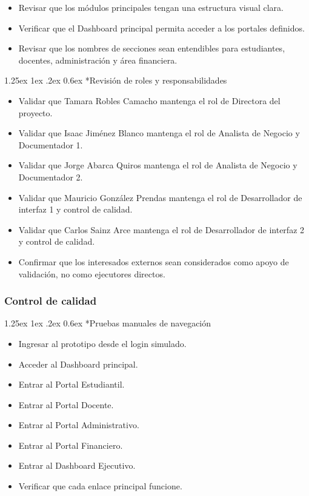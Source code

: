 \documentclass[11pt,spanish]{article}
\makeatletter
\renewcommand\paragraph{\@startsection{paragraph}{4}{\z@}%
  {1.25ex \@plus1ex \@minus.2ex}%
  {0.6ex}%
  {\normalfont\normalsize\bfseries}}
\makeatother
\begin{document}
\begin{itemize}[leftmargin=*]
    \item Revisar que los módulos principales tengan una estructura visual clara.
    \item Verificar que el Dashboard principal permita acceder a los portales definidos.
    \item Revisar que los nombres de secciones sean entendibles para estudiantes, docentes, administración y área financiera.
\end{itemize}

\paragraph*{Revisión de roles y responsabilidades}

\begin{itemize}[leftmargin=*]
    \item Validar que Tamara Robles Camacho mantenga el rol de Directora del proyecto.
    \item Validar que Isaac Jiménez Blanco mantenga el rol de Analista de Negocio y Documentador 1.
    \item Validar que Jorge Abarca Quiros mantenga el rol de Analista de Negocio y Documentador 2.
    \item Validar que Mauricio González Prendas mantenga el rol de Desarrollador de interfaz 1 y control de calidad.
    \item Validar que Carlos Sainz Arce mantenga el rol de Desarrollador de interfaz 2 y control de calidad.
    \item Confirmar que los interesados externos sean considerados como apoyo de validación, no como ejecutores directos.
\end{itemize}

\subsubsection{Control de calidad}

\paragraph*{Pruebas manuales de navegación}

\begin{itemize}[leftmargin=*]
    \item Ingresar al prototipo desde el login simulado.
    \item Acceder al Dashboard principal.
    \item Entrar al Portal Estudiantil.
    \item Entrar al Portal Docente.
    \item Entrar al Portal Administrativo.
    \item Entrar al Portal Financiero.
    \item Entrar al Dashboard Ejecutivo.
    \item Verificar que cada enlace principal funcione.
\end{itemize}
\end{document}
